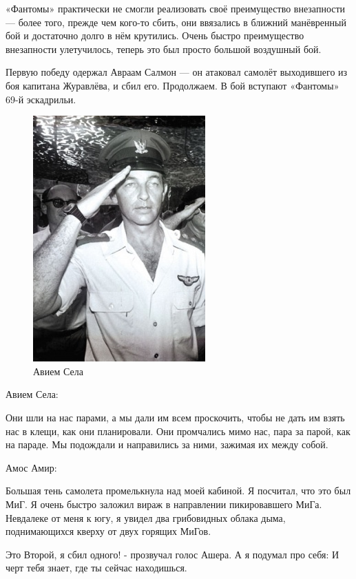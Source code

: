 «Фантомы» практически не смогли реализовать своё преимущество внезапности — более того, прежде чем кого-то сбить, они ввязались в ближний манёвренный бой и достаточно долго в нём крутились. Очень быстро преимущество внезапности улетучилось, теперь это был просто большой воздушный бой.

Первую победу одержал Авраам Салмон — он атаковал самолёт выходившего из боя капитана Журавлёва, и сбил его. Продолжаем. В бой вступают «Фантомы» 69-й эскадрильи.

\begin{figure}[h!tb] 
	\centering\includegraphics[scale=0.25]{Dolina_5/eUWubHXS7UA.jpg}
	\caption{Авием Села}%
\end{figure}

Авием Села:

\begin{textcitation}
	Они шли на нас парами, а мы дали им всем проскочить, чтобы не дать им взять нас в клещи, как они планировали. Они промчались мимо нас, пара за парой, как на параде. Мы подождали и направились за ними, зажимая их между собой.
\end{textcitation}

Амос Амир:

\begin{textcitation}
	Большая тень самолета промелькнула над моей кабиной. Я посчитал, что это был МиГ. Я очень быстро заложил вираж в направлении пикировавшего МиГа. Невдалеке от меня к югу, я увидел два грибовидных облака дыма, поднимающихся кверху от двух горящих МиГов.
	
	Это Второй, я сбил одного! - прозвучал голос Ашера. А я подумал про себя: И черт тебя знает, где ты сейчас находишься.
\end{textcitation}

